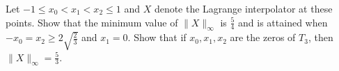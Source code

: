 \begin{problem}
Let $−1 ≤ x_0 < x_1 < x_2 ≤ 1$ and $X$ denote the Lagrange
interpolator at these points. Show that the minimum value of
$\|X\|_\infty$ is $\frac{5}{4}$ and is attained when $−x_0 = x_2 ≥ 2
\sqrt{\frac{2}{3}}$ and $x_1 = 0$. Show that if $x_0 , x_1 , x_2$ are
the zeros of $T_3$, then $\|X\|_\infty = \frac{5}{3}$.
\end{problem}


\begin{solution}  

\end{solution}

